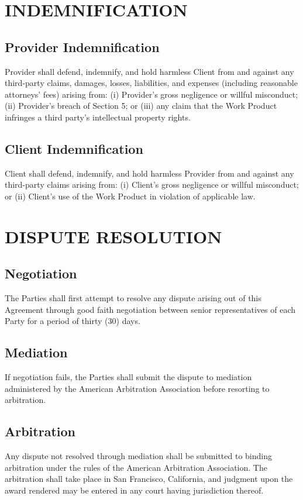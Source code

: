\documentclass[
    language=english,
    doctype=contract,
    institution=none,
]{../../omnilatex}
\begin{document}
\section{INDEMNIFICATION}

\subsection{Provider Indemnification}
Provider shall defend, indemnify, and hold harmless Client from and against any third-party claims, damages, losses, liabilities, and expenses (including reasonable attorneys' fees) arising from: (i) Provider's gross negligence or willful misconduct; (ii) Provider's breach of Section 5; or (iii) any claim that the Work Product infringes a third party's intellectual property rights.

\subsection{Client Indemnification}
Client shall defend, indemnify, and hold harmless Provider from and against any third-party claims arising from: (i) Client's gross negligence or willful misconduct; or (ii) Client's use of the Work Product in violation of applicable law.

\section{DISPUTE RESOLUTION}

\subsection{Negotiation}
The Parties shall first attempt to resolve any dispute arising out of this Agreement through good faith negotiation between senior representatives of each Party for a period of thirty (30) days.

\subsection{Mediation}
If negotiation fails, the Parties shall submit the dispute to mediation administered by the American Arbitration Association before resorting to arbitration.

\subsection{Arbitration}
Any dispute not resolved through mediation shall be submitted to binding arbitration under the rules of the American Arbitration Association. The arbitration shall take place in San Francisco, California, and judgment upon the award rendered may be entered in any court having jurisdiction thereof.
\end{document}
